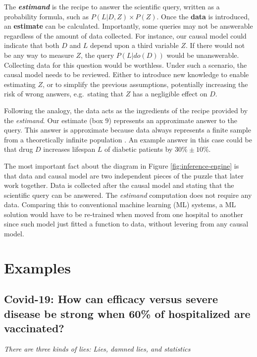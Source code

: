 \documentclass[
  12pt,
]{book}
\newenvironment{rnote}{\par\raggedleft}{\par}
\begin{document}
The \textbf{\emph{estimand}} is the recipe to answer the scientific query, written as a probability formula, such as \(P(L | D, Z) \times P(Z)\). Once the \textbf{data} is introduced, an \textbf{estimate} can be calculated. Importantly, some queries may not be answerable regardless of the amount of data collected. For instance, our causal model could indicate that both \(D\) and \(L\) depend upon a third variable \(Z\). If there would not be any way to measure \(Z\), the query \(P(L | do(D))\) would be unanswerable. Collecting data for this question would be worthless. Under such a scenario, the causal model needs to be reviewed. Either to introduce new knowledge to enable estimating \(Z\), or to simplify the previous assumptions, potentially increasing the risk of wrong answers, e.g.~stating that \(Z\) has a negligible effect on \(D\).

Following the analogy, the data acts as the ingredients of the recipe provided by the \emph{estimand}. Our estimate (box \(9\)) represents an approximate answer to the query. This answer is approximate because data always represents a finite sample from a theoretically infinite population \citep{book-of-why}. An example answer in this case could be that drug \(D\) increases lifespan \(L\) of diabetic patients by \(30\% \pm 10\%\).

The most important fact about the diagram in Figure \ref{fig:inference-engine} is that data and causal model are two independent pieces of the puzzle that later work together. Data is collected after the causal model and stating that the scientific query can be answered. The \emph{estimand} computation does not require any data. Comparing this to conventional machine learning (ML) systems, a ML solution would have to be re-trained when moved from one hospital to another since such model just fitted a function to data, without levering from any causal model.

\section{Examples}\label{examples-3}

\subsection{Covid-19: How can efficacy versus severe disease be strong when 60\% of hospitalized are vaccinated?}\label{covid-israel}

\begin{rnote}
\emph{There are three kinds of lies: Lies, damned lies, and statistics}

\end{rnote}
\end{document}
